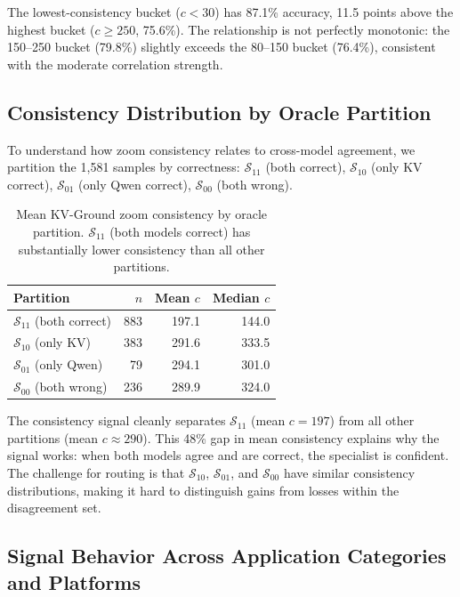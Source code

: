 \documentclass{article}
\begin{document}
The lowest-consistency bucket ($c < 30$) has 87.1\% accuracy, 11.5 points above the highest bucket ($c \geq 250$, 75.6\%). The relationship is not perfectly monotonic: the 150--250 bucket (79.8\%) slightly exceeds the 80--150 bucket (76.4\%), consistent with the moderate correlation strength.

\subsection{Consistency Distribution by Oracle Partition}

To understand how zoom consistency relates to cross-model agreement, we partition the 1,581 samples by correctness: $\mathcal{S}_{11}$ (both correct), $\mathcal{S}_{10}$ (only KV correct), $\mathcal{S}_{01}$ (only Qwen correct), $\mathcal{S}_{00}$ (both wrong).

\begin{table}[h]
\centering
\caption{Mean KV-Ground zoom consistency by oracle partition. $\mathcal{S}_{11}$ (both models correct) has substantially lower consistency than all other partitions.}
\label{tab:partition}
\begin{tabular}{lrrr}
\toprule
\textbf{Partition} & \textbf{$n$} & \textbf{Mean $c$} & \textbf{Median $c$} \\
\midrule
$\mathcal{S}_{11}$ (both correct) & 883 & 197.1 & 144.0 \\
$\mathcal{S}_{10}$ (only KV) & 383 & 291.6 & 333.5 \\
$\mathcal{S}_{01}$ (only Qwen) & 79 & 294.1 & 301.0 \\
$\mathcal{S}_{00}$ (both wrong) & 236 & 289.9 & 324.0 \\
\bottomrule
\end{tabular}
\end{table}

The consistency signal cleanly separates $\mathcal{S}_{11}$ (mean $c = 197$) from all other partitions (mean $c \approx 290$). This 48\% gap in mean consistency explains why the signal works: when both models agree and are correct, the specialist is confident. The challenge for routing is that $\mathcal{S}_{10}$, $\mathcal{S}_{01}$, and $\mathcal{S}_{00}$ have similar consistency distributions, making it hard to distinguish gains from losses within the disagreement set.

\subsection{Signal Behavior Across Application Categories and Platforms}
\end{document}
